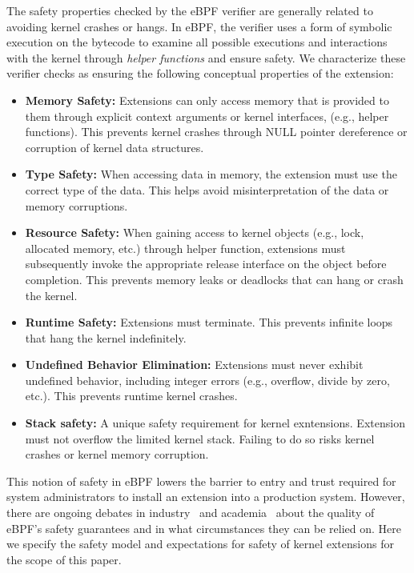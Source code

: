 The safety properties checked by the eBPF verifier are generally
related to avoiding kernel crashes or hangs.  In eBPF, the verifier
uses a form of symbolic execution on the bytecode to examine all
possible executions and interactions with the kernel through {\em
  helper functions}  and ensure safety.  We characterize these verifier
checks as ensuring the following conceptual properties of the
extension: 
\begin{itemize}
\item {\bf Memory Safety:} Extensions can only access memory that is
  provided to them through explicit context arguments or kernel
  interfaces, (e.g., helper functions).  This prevents kernel crashes
  through NULL pointer dereference or corruption of kernel data
  structures.
\item {\bf Type Safety:} When accessing data in memory, the extension must use
  the correct type of the data. This helps avoid misinterpretation of the data
  or memory corruptions.
\item {\bf Resource Safety:} When gaining access to kernel objects
  (e.g., lock, allocated memory, etc.) through helper function,
  extensions must subsequently invoke the appropriate release
  interface on the object before completion.  This prevents memory
  leaks or deadlocks that can hang or crash the kernel.
\item {\bf Runtime Safety:} Extensions must terminate. This prevents
  infinite loops that hang the kernel indefinitely.
\item {\bf Undefined Behavior Elimination:} Extensions must never
  exhibit undefined behavior, including integer errors (e.g.,
  overflow, divide by zero, etc.). This prevents runtime kernel
  crashes.
\item {\bf Stack safety:} A unique safety requirement for kernel exntensions.
  Extension must not overflow the limited kernel stack.
  Failing to do so risks kernel crashes or kernel memory corruption.
\end{itemize}

This notion of safety in eBPF lowers the barrier to entry and trust
required for system administrators to install an extension into a
production system.  However, there are ongoing debates in
industry~\cite{reconsider-unpriv-ebpf-lwn,seccomp-ebpf-lwn,ebpf-sec-lwn} and
academia~\cite{untenableVerification} about the quality of eBPF's
safety guarantees and in what circumstances they can be relied on.
Here we specify the safety model and expectations for safety of kernel
extensions for the scope of this paper.

